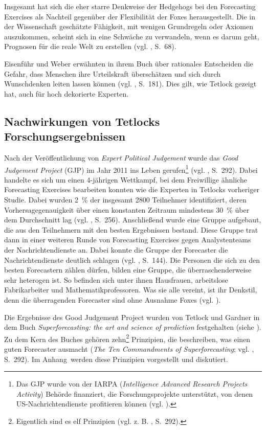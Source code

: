 Insgesamt hat sich die eher starre Denkweise der Hedgehogs bei den Forecasting
Exercises als Nachteil gegenüber der Flexibilität der Foxes herausgestellt. 
Die in der Wissenschaft geschätzte Fähigkeit, mit wenigen Grundregeln oder
Axiomen auszukommen, scheint sich in eine Schwäche zu verwandeln, wenn
es darum geht, Prognosen für die reale Welt zu erstellen (vgl. \cite{Tetlock},
S.~68).

Eisenführ und Weber erwähnten in ihrem Buch über rationales Entscheiden die Gefahr,
dass Menschen ihre Urteilskraft überschätzen und sich durch
Wunschdenken leiten lassen können (vgl. \cite{Eisenfuehr}, S.~181). 
Dies gilt, wie Tetlock gezeigt hat, auch für hoch dekorierte Experten.

\subsection{Nachwirkungen von Tetlocks Forschungsergebnissen}

Nach der Veröffentlichung von \emph{Expert Political Judgement} wurde das
\emph{Good Judgement Project} (GJP) im Jahr 2011 ins Leben gerufen\footnote{
Das GJP wurde von der IARPA (\emph{Intelligence Advanced Research Projects
Activity}) Behörde finanziert, die Forschungsprojekte
unterstützt, von denen US-Nachrichtendienste profitieren können (vgl. \cite{Burton}).
} (vgl. \cite{Jackson}, S.~292). Dabei handelte es sich um einen 4-jährigen Wettkampf, bei dem
Freiwillige ähnliche Forecasting Exercises bearbeiten konnten wie die Experten
in Tetlocks vorheriger Studie. Dabei wurden 2~\% der insgesamt 2800 Teilnehmer identifiziert, 
deren Vorhersagegenauigkeit über einen konstanten Zeitraum
mindestens 30~\%  über dem Durchschnitt lag (vgl. \cite{Roetheli}, S.~256). Anschließend wurde eine Gruppe
aufgebaut, die aus den Teilnehmern mit den besten Ergebnissen bestand. Diese
Gruppe trat dann in einer weiteren Runde von Forecasting Exercises gegen
Analystenteams der Nachrichtendienste an. Dabei konnte die Gruppe der Forecaster
die Nachrichtendienste deutlich schlagen (vgl. \cite{Roche}, S.~144). Die Personen
die sich zu den besten Forecastern zählen dürfen, bilden eine Gruppe, die überraschenderweise sehr heterogen ist.
So befinden sich unter ihnen Hausfrauen, arbeitslose
Fabrikarbeiter und Mathematikprofessoren. Was sie alle vereint, ist ihr Denkstil,
denn die überragenden Forecaster sind ohne Ausnahme Foxes (vgl. \cite{Economist}).

Die Ergebnisse des Good Judgement Project wurden von Tetlock und Gardner
in dem Buch \emph{Superforecasting: the art and science of prediction} festgehalten (siehe \cite{Super}).
Zu dem Kern des Buches gehören zehn\footnote{Eigentlich sind es elf Prinzipien (vgl. z. B. \cite{Jackson}, S.~292).}
Prinzipien, die beschreiben, was einen guten Forecaster ausmacht (\emph{The Ten Commandments of Superforecasting};
vgl. \cite{Jackson}, S.~292). Im Anhang~\xcom werden diese Prinzipien vorgestellt und diskutiert.

